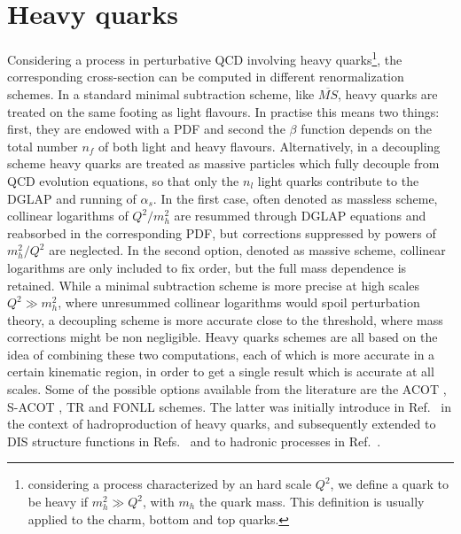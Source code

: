 \section{Heavy quarks}
\label{sec:fonll}
Considering a process in perturbative QCD involving heavy quarks\footnote{considering a process 
characterized by an hard scale $Q^2$,
we define a quark to be heavy if $m_h^2\gg Q^2$, with $m_h$ the quark mass. 
This definition is usually applied to the charm, bottom and top quarks.}, the corresponding cross-section
can be computed  in different renormalization schemes. In a standard minimal subtraction scheme, like $\overline{MS}$,
heavy quarks are treated on the same footing
as light flavours. 
In practise this means two things: first, they are endowed with a PDF and second 
the $\beta$ function depends on the total number $n_f$ of both light and heavy flavours. 
Alternatively, in a decoupling scheme heavy quarks are treated as massive particles 
which fully decouple from QCD evolution equations, 
so that only the $n_l$ light quarks contribute to the DGLAP and running of $\alpha_s$.
In the first case, often denoted as massless scheme, collinear logarithms of $Q^2/m_h^2$
are resummed through DGLAP equations and reabsorbed in the corresponding PDF, but corrections
suppressed by powers of $m_h^2/Q^2$ are neglected.
In the second option, denoted as massive scheme, collinear logarithms are only included to fix order, but the 
full mass dependence is retained.
While a minimal subtraction scheme is more precise at high scales $Q^2 \gg m_h^2$, where unresummed collinear logarithms
would spoil perturbation theory, a decoupling scheme is more accurate close to the threshold, where mass
corrections might be non negligible.
Heavy quarks schemes are all based on the idea of combining these two computations, each of which is more accurate 
in a certain kinematic region, in order to get a single result which is accurate at all scales.
Some of the possible options available from the literature are 
the ACOT \cite{Aivazis:1993pi, Aivazis:1993kh, Tung:2001mv}, S-ACOT \cite{Kramer:2000hn}, TR \cite{Thorne:1997ga}
and FONLL schemes.
The latter was initially introduce in Ref.~\cite{Cacciari:1998it} in the context of hadroproduction of heavy quarks, and subsequently 
extended to DIS structure functions in Refs.~\cite{Forte:2010ta} and to hadronic processes in Ref.~\cite{Forte:2015hba}.

